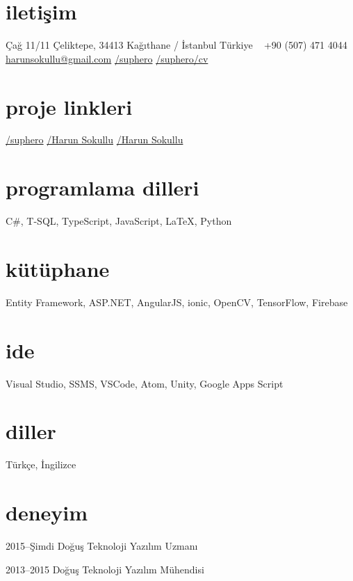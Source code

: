 \documentclass[]{../friggeri-cv} %
\begin{document}

\begin{aside}
\section{iletişim}
Çağ 11/11
Çeliktepe, 34413
Kağıthane / İstanbul
Türkiye
~
+90 (507) 471 4044
~
\href{mailto:harunsokullu@gmail.com}{harunsokullu@gmail.com}
\href{https://www.linkedin.com/in/suphero}{\faLinkedin/suphero}
\href{https://github.com/suphero/cv/raw/master/Turkish/Harun\%20Sokullu.pdf}{\faGithub/suphero/cv}
\section{proje linkleri}
\href{https://github.com/suphero}{\faGithub/suphero}
\href{https://play.google.com/store/apps/developer?id=Harun+Sokullu}{\faAndroid/Harun Sokullu}
\href{https://itunes.apple.com/tr/developer/harun-sokullu/id1265151811}{\faApple/Harun Sokullu}
\section{programlama dilleri}
C\#, T-SQL, TypeScript, JavaScript, \LaTeX, Python
\section{kütüphane}
Entity Framework, ASP.NET, AngularJS, ionic, OpenCV, TensorFlow, Firebase
\section{ide}
Visual Studio, SSMS, VSCode, Atom, Unity, Google Apps Script
\section{diller}
Türkçe, İngilizce
\end{aside}

\section{deneyim}

\begin{entrylist}

\entry
{2015--Şimdi}
{Doğuş Teknoloji}
{}
{Yazılım Uzmanı}

\entry
{2013--2015}
{Doğuş Teknoloji}
{}
{Yazılım Mühendisi}

\end{entrylist}
\end{document}
